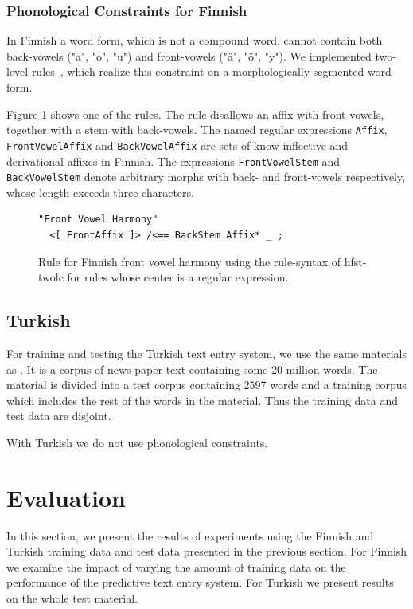 \documentclass{llncs}
\begin{document}
\subsubsection{Phonological Constraints for Finnish}

In Finnish a word form, which is not a compound word, cannot contain
both back-vowels ("a", "o", "u") and front-vowels ("ä", "ö", "y"). We
implemented two-level rules~\cite{koskenniemi/1983}, which realize
this constraint on a morphologically segmented word form.

Figure \ref{fi-constraints} shows one of the rules. The rule disallows
an affix with front-vowels, together with a stem with back-vowels. The
named regular expressions \verb|Affix|, \verb|FrontVowelAffix| and
\verb|BackVowelAffix| are sets of know inflective and derivational affixes
in Finnish. The expressions \verb|FrontVowelStem| and \verb|BackVowelStem|
denote arbitrary morphs with back- and front-vowels respectively,
whose length exceeds three characters.

\begin{figure}
\begin{verbatim}
"Front Vowel Harmony"
  <[ FrontAffix ]> /<== BackStem Affix* _ ; 
\end{verbatim}
\caption{Rule for Finnish front vowel harmony using the rule-syntax of hfst-twolc for rules whose center is a regular expression.}\label{fi-constraints}
\end{figure}

\subsection{Turkish}

For training and testing the Turkish text entry system, we use the
same materials as \cite{Tantug:2010}. It is a corpus of news paper text
containing some $20$ million words. The material is divided into a
test corpus containing $2597$ words and a training corpus which
includes the rest of the words in the material. Thus the training data
and test data are disjoint.

With Turkish we do not use phonological constraints.

\section{Evaluation}\label{evaluation}

In this section, we present the results of experiments using the
Finnish and Turkish training data and test data presented in the
previous section. For Finnish we examine the impact of varying the
amount of training data on the performance of the predictive text
entry system. For Turkish we present results on the whole test
material.
\end{document}
